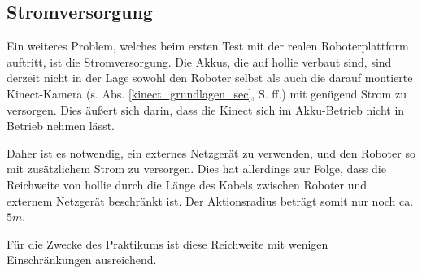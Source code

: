 


\subsection{Stromversorgung}

Ein weiteres Problem, welches beim ersten Test mit der realen Roboterplattform auftritt, ist die Stromversorgung.
Die Akkus, die auf \gls{hollie} verbaut sind, sind derzeit nicht in der Lage sowohl den Roboter selbst als auch die darauf montierte Kinect-Kamera (s. Abs. \ref{kinect_grundlagen_sec}, S. \pageref{kinect_grundlagen_sec} ff.) mit genügend Strom zu versorgen.
Dies äußert sich darin, dass die Kinect sich im Akku-Betrieb nicht in Betrieb nehmen lässt.

Daher ist es notwendig, ein externes Netzgerät zu verwenden, und den Roboter so mit zusätzlichem Strom zu versorgen.
Dies hat allerdings zur Folge, dass die Reichweite von \gls{hollie} durch die Länge des Kabels zwischen Roboter und externem Netzgerät beschränkt ist.
Der Aktionsradius beträgt somit nur noch ca. $5m$.

Für die Zwecke des Praktikums ist diese Reichweite mit wenigen Einschränkungen ausreichend.




